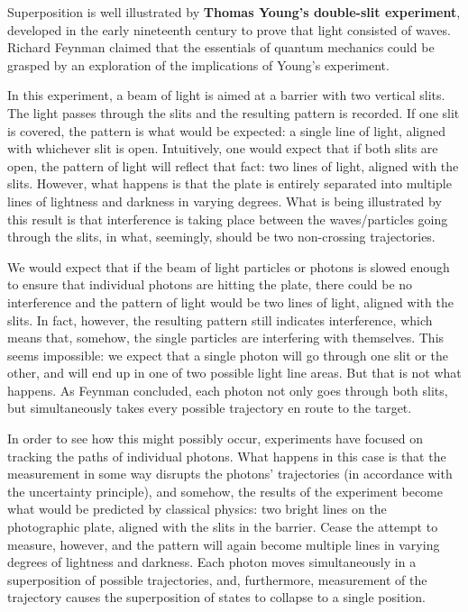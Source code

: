 \documentclass[12pt, oneside]{book}
\begin{document}
Superposition is well illustrated by \textbf{Thomas Young's double-slit
experiment}, developed in the early nineteenth century to prove that light
consisted of waves. Richard Feynman claimed that the essentials of quantum
mechanics could be grasped by an exploration of the implications of Young's
experiment.

In this experiment, a beam of light is aimed at a barrier with two vertical
slits.  The light passes through the slits and the resulting pattern is
recorded.  If one slit is covered, the pattern is what would be expected: a
single line of light, aligned with whichever slit is open. Intuitively, one
would expect that if both slits are open, the pattern of light will reflect
that fact: two lines of light, aligned with the slits.  However, what happens
is that the plate is entirely separated into multiple lines of lightness and
darkness in varying degrees.  What is being illustrated by this result is that
interference is taking place between the waves/particles going through the
slits, in what, seemingly, should be two non-crossing trajectories.

We would expect that if the beam of light particles or photons is slowed enough
to ensure that individual photons are hitting the plate, there could be no
interference and the pattern of light would be two lines of light, aligned with
the slits. In fact, however, the resulting pattern still indicates
interference, which means that, somehow, the single particles are interfering
with themselves. This seems impossible: we expect that a single photon will go
through one slit or the other, and will end up in one of two possible light
line areas. But that is not what happens. As Feynman concluded, each photon not
only goes through both slits, but simultaneously takes every possible
trajectory en route to the target.

In order to see how this might possibly occur, experiments have focused on
tracking the paths of individual photons. What happens in this case is that the
measurement in some way disrupts the photons' trajectories (in accordance with
the uncertainty principle), and somehow, the results of the experiment become
what would be predicted by classical physics: two bright lines on the
photographic plate, aligned with the slits in the barrier. Cease the attempt to
measure, however, and the pattern will again become multiple lines in varying
degrees of lightness and darkness. Each photon moves simultaneously in a
superposition of possible trajectories, and, furthermore, measurement of the
trajectory causes the superposition of states to collapse to a single position.
\end{document}
